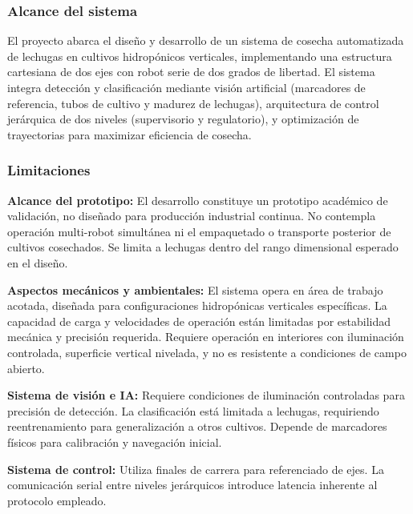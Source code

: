 \subsubsection{Alcance del sistema}

El proyecto abarca el diseño y desarrollo de un sistema de cosecha automatizada de lechugas en cultivos hidropónicos verticales, implementando una estructura cartesiana de dos ejes con robot serie de dos grados de libertad. El sistema integra detección y clasificación mediante visión artificial (marcadores de referencia, tubos de cultivo y madurez de lechugas), arquitectura de control jerárquica de dos niveles (supervisorio y regulatorio), y optimización de trayectorias para maximizar eficiencia de cosecha.

\subsubsection{Limitaciones}

\textbf{Alcance del prototipo:} El desarrollo constituye un prototipo académico de validación, no diseñado para producción industrial continua. No contempla operación multi-robot simultánea ni el empaquetado o transporte posterior de cultivos cosechados. Se limita a lechugas dentro del rango dimensional esperado en el diseño.

\textbf{Aspectos mecánicos y ambientales:} El sistema opera en área de trabajo acotada, diseñada para configuraciones hidropónicas verticales específicas. La capacidad de carga y velocidades de operación están limitadas por estabilidad mecánica y precisión requerida. Requiere operación en interiores con iluminación controlada, superficie vertical nivelada, y no es resistente a condiciones de campo abierto.

\textbf{Sistema de visión e IA:} Requiere condiciones de iluminación controladas para precisión de detección. La clasificación está limitada a lechugas, requiriendo reentrenamiento para generalización a otros cultivos. Depende de marcadores físicos para calibración y navegación inicial.

\textbf{Sistema de control:} Utiliza finales de carrera para referenciado de ejes. La comunicación serial entre niveles jerárquicos introduce latencia inherente al protocolo empleado.


